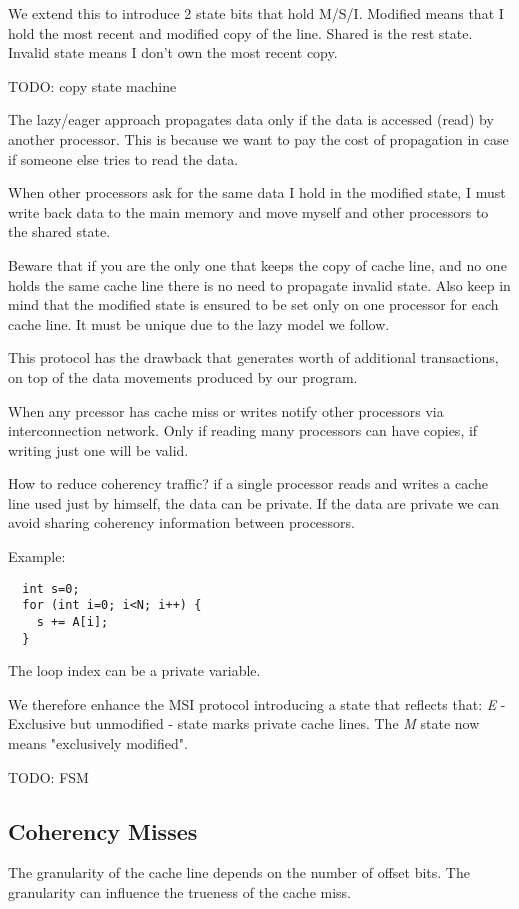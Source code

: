 We extend this to introduce 2 state bits that hold M/S/I.
Modified means that I hold the most recent and modified copy of the line.
Shared is the rest state.
Invalid state means I don't own the most recent copy.

TODO: copy state machine

The lazy/eager approach propagates data only if the data is accessed (read) by another processor.
This is because we want to pay the cost of propagation in case if someone else tries to read the data.

When other processors ask for the same data I hold in the modified state, I must write back data to the main memory and move myself and other processors to the shared state.

Beware that if you are the only one that keeps the copy of cache line, and no one holds the same cache line there is no need to propagate invalid state.
Also keep in mind that the modified state is ensured to be set only on one processor for each cache line. It must be unique due to the lazy model we follow.

This protocol has the drawback that generates worth of additional transactions, on top of the data movements produced by our program.

When any prcessor has cache miss or writes notify other processors via interconnection network. Only if reading many processors can have copies, if writing just one will be valid.

How to reduce coherency traffic? if a single processor reads and writes a cache line used just by himself, the data can be private. 
If the data are private we can avoid sharing coherency information between processors.

Example:
\begin{verbatim}
  int s=0;
  for (int i=0; i<N; i++) {
    s += A[i];
  }
\end{verbatim}

The loop index can be a private variable.

We therefore enhance the MSI protocol introducing a state that reflects that: \textit{E} - Exclusive but unmodified - state marks private cache lines.
The \textit{M} state now means "exclusively modified".

TODO: FSM

\subsection{Coherency Misses}
The granularity of the cache line depends on the number of offset bits. The granularity can influence the trueness of the cache miss.

